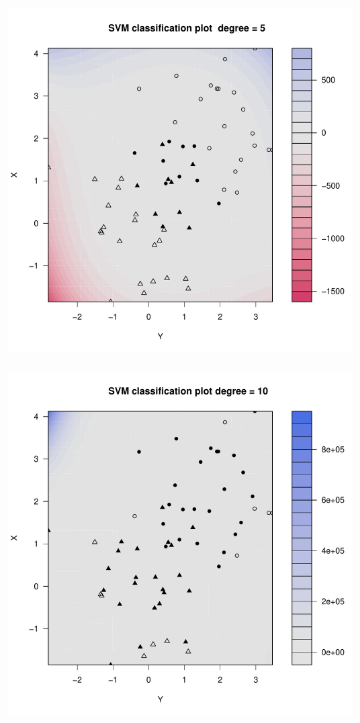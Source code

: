 \begin{figure}[H]
\begin{subfigure}{0.24\linewidth}
		\caption{}
	\end{subfigure}
	\begin{subfigure}{0.24\linewidth}
		\includegraphics[width=1\linewidth]{Graphics/Problema_01/Experiment_02_3.pdf}
		\caption{}
	\end{subfigure}
	\begin{subfigure}{0.24\linewidth}
		\includegraphics[width=1\linewidth]{Graphics/Problema_01/Experiment_02_4.pdf}
		\caption{}
	\end{subfigure}
	\caption{}
\end{figure}

